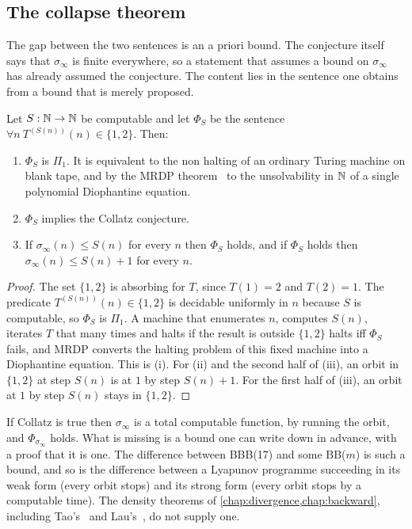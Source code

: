 \subsection{The collapse theorem}

The gap between the two sentences is an a priori bound. The conjecture itself says that $\sigma_\infty$ is finite everywhere, so a statement that assumes a bound on $\sigma_\infty$ has already assumed the conjecture. The content lies in the sentence one obtains from a bound that is merely proposed.

\begin{theorem}\label{thm:ch21:collapse}
Let $S:\mathbb{N}\to\mathbb{N}$ be computable and let $\Phi_S$ be the sentence $\forall n\ T^{(S(n))}(n)\in\{1,2\}$. Then:
\begin{enumerate}[label=(\roman*),leftmargin=2em]
\item $\Phi_S$ is $\Pi_1$. It is equivalent to the non halting of an ordinary Turing machine on blank tape, and by the MRDP theorem~\cite{matiyasevich1993} to the unsolvability in $\mathbb{N}$ of a single polynomial Diophantine equation.
\item $\Phi_S$ implies the Collatz conjecture.
\item If $\sigma_\infty(n)\le S(n)$ for every $n$ then $\Phi_S$ holds, and if $\Phi_S$ holds then $\sigma_\infty(n)\le S(n)+1$ for every $n$.
\end{enumerate}
\end{theorem}

\begin{proof}
The set $\{1,2\}$ is absorbing for $T$, since $T(1)=2$ and $T(2)=1$. The predicate $T^{(S(n))}(n)\in\{1,2\}$ is decidable uniformly in $n$ because $S$ is computable, so $\Phi_S$ is $\Pi_1$. A machine that enumerates $n$, computes $S(n)$, iterates $T$ that many times and halts if the result is outside $\{1,2\}$ halts iff $\Phi_S$ fails, and MRDP converts the halting problem of this fixed machine into a Diophantine equation. This is (i). For (ii) and the second half of (iii), an orbit in $\{1,2\}$ at step $S(n)$ is at $1$ by step $S(n)+1$. For the first half of (iii), an orbit at $1$ by step $S(n)$ stays in $\{1,2\}$.
\end{proof}

If Collatz is true then $\sigma_\infty$ is a total computable function, by running the orbit, and $\Phi_{\sigma_\infty}$ holds. What is missing is a bound one can write down in advance, with a proof that it is one. The difference between BBB(17) and some BB($m$) is such a bound, and so is the difference between a Lyapunov programme succeeding in its weak form (every orbit stops) and its strong form (every orbit stops by a computable time). The density theorems of \cref{chap:divergence,chap:backward}, including Tao's~\cite{tao2022} and Lau's~\cite{lau2026}, do not supply one.

